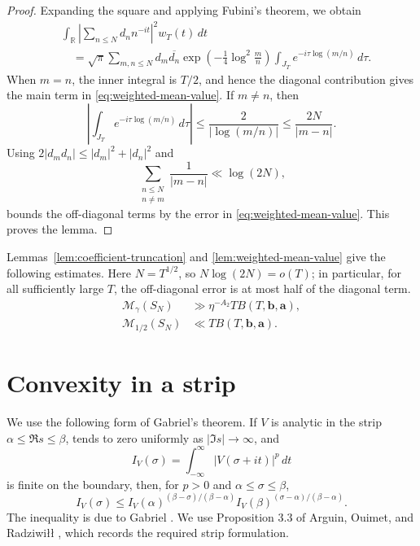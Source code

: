 \documentclass[11pt]{amsart}
\numberwithin{equation}{section}
\theoremstyle{plain}
\newcommand{\R}{\mathbb{R}}
\renewcommand{\bar}[1]{\overline{#1}}
\renewcommand{\le}{\leqslant}
\begin{document}
\begin{proof}
Expanding the square and applying Fubini's theorem, we obtain
\begin{align*}
&\int_{\R}\left|\sum_{n\le N}d_n n^{-it}\right|^2w_T(t)\,dt\\
&\quad=\sqrt\pi\sum_{m,n\le N}d_m\bar{d_n}
\exp\left(-\frac14\log^2\frac mn\right)
\int_{J_T}e^{-i\tau\log(m/n)}\,d\tau.
\end{align*}
When $m=n$, the inner integral is $T/2$, and hence the diagonal
contribution gives the main term in \eqref{eq:weighted-mean-value}.  If
$m\ne n$, then
\begin{equation*}
\left|\int_{J_T}e^{-i\tau\log(m/n)}\,d\tau\right|
\le\frac{2}{|\log(m/n)|}
\le\frac{2N}{|m-n|}.
\end{equation*}
Using $2|d_m d_n|\le|d_m|^2+|d_n|^2$ and
\begin{equation*}
\sum_{\substack{n\le N\\n\ne m}}\frac1{|m-n|}
\ll\log(2N),
\end{equation*}
bounds the off-diagonal terms by the error in
\eqref{eq:weighted-mean-value}.  This proves the lemma.
\end{proof}

Lemmas~\ref{lem:coefficient-truncation} and
\ref{lem:weighted-mean-value} give the following estimates.  Here
$N=T^{1/2}$, so $N\log(2N)=o(T)$; in particular, for all sufficiently
large $T$, the off-diagonal error is at most half of the diagonal term.
\begin{align}
\mathcal M_\gamma(S_N)
&\gg \eta^{-A_2}T B(T,\mathbf b,\mathbf a),
                                                        \label{eq:S-gamma-lower}\\
\mathcal M_{1/2}(S_N)
&\ll T B(T,\mathbf b,\mathbf a).                \label{eq:S-half-upper}
\end{align}

\section{Convexity in a strip}\label{sec:convexity}

We use the following form of Gabriel's theorem.  If $V$ is analytic in the
strip $\alpha\le\Re s\le\beta$, tends to zero uniformly as
$|\Im s|\to\infty$, and
\begin{equation*}
I_V(\sigma)=\int_{-\infty}^{\infty}|V(\sigma+it)|^p\,dt
\end{equation*}
is finite on the boundary, then, for $p>0$ and
$\alpha\le\sigma\le\beta$,
\begin{equation}\label{eq:gabriel-original}
I_V(\sigma)
\le I_V(\alpha)^{(\beta-\sigma)/(\beta-\alpha)}
I_V(\beta)^{(\sigma-\alpha)/(\beta-\alpha)}.
\end{equation}
The inequality is due to Gabriel \cite{Gabriel}.  We use Proposition 3.3 of
Arguin, Ouimet, and Radziwi\l\l{} \cite{ArguinOuimetRadziwill}, which records
the required strip formulation.
\end{document}
